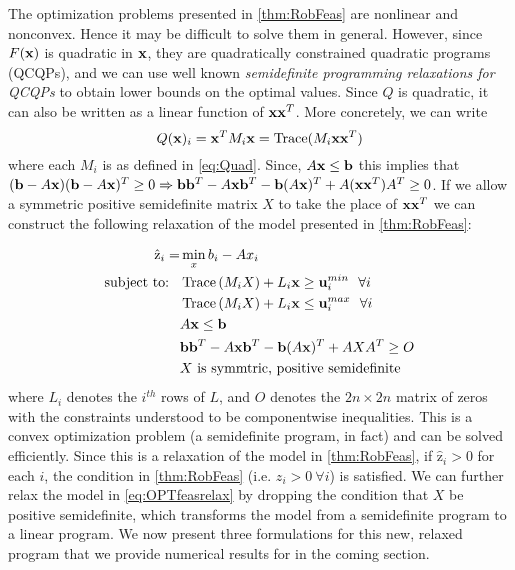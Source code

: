 

The optimization problems presented in \cref{thm:RobFeas} are nonlinear and nonconvex.
Hence it may be difficult to solve them in general.
However, since $F(\mathbf{x})$ is quadratic in $\mathbf{x}$, they are quadratically constrained quadratic programs (QCQPs), and we can use well known \emph{semidefinite programming relaxations for QCQPs} 
to obtain lower bounds on the optimal values.\cite{VaBo1996} 
Since $Q$ is quadratic, it can also be written as a linear function of $\mathbf{x}\mathbf{x}^T$.
More concretely, we can write
$$Q(\mathbf{x})_i=\mathbf{x}^TM_i\mathbf{x}=\operatorname{Trace}(M_i\mathbf{x}\mathbf{x}^T)$$
where each $M_i$ is as defined in \eqref{eq:Quad}. 
Since, $A\mathbf{x}\leq \mathbf{b}$ this implies that $(\mathbf{b}-A\mathbf{x})(\mathbf{b}-A\mathbf{x})^T\geq 0\Rightarrow \mathbf{b}\mathbf{b}^T-A\mathbf{x}\mathbf{b}^T-\mathbf{b}(A\mathbf{x})^T+A(\mathbf{x}\mathbf{x}^T)A^T\geq 0$. 
If we allow a symmetric positive semidefinite matrix $X$ to take the place of $\mathbf{x}\mathbf{x}^T$ we can construct the following relaxation of the model presented in \cref{thm:RobFeas}:
 
\begin{subequations}\label{eq:OPTfeasrelax}
\begin{align}
\hat{\mathrm{z}}_{i} = &\min_x b_i-Ax_i  \\
 \text{subject to: } \ & \operatorname{Trace}\left(M_iX\right)+ L_i\mathbf{x} \geq \mathbf{u}_i^{min} \ \ \forall i\\
 & \operatorname{Trace}\left(M_iX\right)+ L_i\mathbf{x} \leq \mathbf{u}_i^{max} \ \ \forall i\\
 	&A\mathbf{x}\leq \mathbf{b} \\
 	&\mathbf{b}\mathbf{b}^T-A\mathbf{x}\mathbf{b}^T-\mathbf{b}(A\mathbf{x})^T+AXA^T\geq O \\
 	&X \text{ is symmtric, positive semidefinite}
\end{align}
\end{subequations}
where $L_i$ denotes the $i^{th}$ rows of $L$, and $O$ denotes the $2n \times 2n$ matrix of zeros with the constraints understood to be componentwise inequalities. 
This is a convex optimization problem (a semidefinite program, in fact) and can be solved efficiently. 
Since this is a relaxation of the model in \cref{thm:RobFeas}, if $\hat{\mathrm{z}}_i>0$ for each $i$, the condition in \cref{thm:RobFeas} (i.e. $z_i>0 \ \forall i$) is satisfied. 
We can further relax the model in \eqref{eq:OPTfeasrelax} by dropping the condition that $X$ be positive semidefinite, which transforms the model from a semidefinite program to a linear program. 
We now present three formulations for this new, relaxed program that we provide numerical results for in the coming section.


